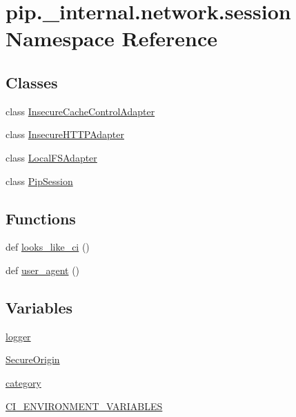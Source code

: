 \hypertarget{namespacepip_1_1__internal_1_1network_1_1session}{}\section{pip.\+\_\+internal.\+network.\+session Namespace Reference}
\label{namespacepip_1_1__internal_1_1network_1_1session}
\subsection*{Classes}
\begin{DoxyCompactItemize}
\item 
class \hyperlink{classpip_1_1__internal_1_1network_1_1session_1_1InsecureCacheControlAdapter}{Insecure\+Cache\+Control\+Adapter}
\item 
class \hyperlink{classpip_1_1__internal_1_1network_1_1session_1_1InsecureHTTPAdapter}{Insecure\+H\+T\+T\+P\+Adapter}
\item 
class \hyperlink{classpip_1_1__internal_1_1network_1_1session_1_1LocalFSAdapter}{Local\+F\+S\+Adapter}
\item 
class \hyperlink{classpip_1_1__internal_1_1network_1_1session_1_1PipSession}{Pip\+Session}
\end{DoxyCompactItemize}
\subsection*{Functions}
\begin{DoxyCompactItemize}
\item 
def \hyperlink{namespacepip_1_1__internal_1_1network_1_1session_a1015d515d92f896dfff3998679899454}{looks\+\_\+like\+\_\+ci} ()
\item 
def \hyperlink{namespacepip_1_1__internal_1_1network_1_1session_a34f028149b08d6e8d346fa1087b8956b}{user\+\_\+agent} ()
\end{DoxyCompactItemize}
\subsection*{Variables}
\begin{DoxyCompactItemize}
\item 
\hyperlink{namespacepip_1_1__internal_1_1network_1_1session_a174329cf205b4cc67957eefb2869abc8}{logger}
\item 
\hyperlink{namespacepip_1_1__internal_1_1network_1_1session_a0e7b2820fcd465d9470a88a9aad901ab}{Secure\+Origin}
\item 
\hyperlink{namespacepip_1_1__internal_1_1network_1_1session_a7e49aa783925608fdefa50d182bcce89}{category}
\item 
\hyperlink{namespacepip_1_1__internal_1_1network_1_1session_ab2ff76c8b3d6915d8aa446375c4320a3}{C\+I\+\_\+\+E\+N\+V\+I\+R\+O\+N\+M\+E\+N\+T\+\_\+\+V\+A\+R\+I\+A\+B\+L\+ES}
\end{DoxyCompactItemize}


